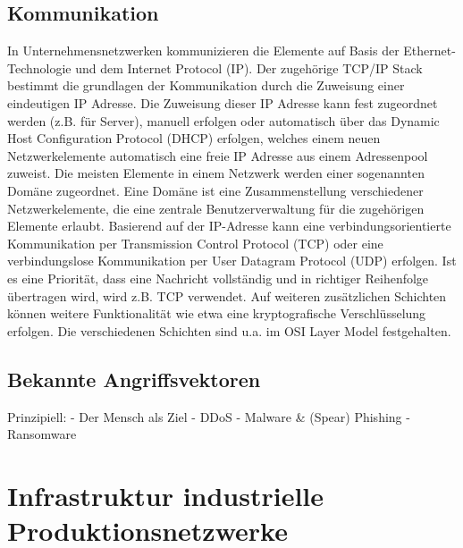 
\subsection{Kommunikation}
In Unternehmensnetzwerken kommunizieren die Elemente auf Basis der Ethernet-Technologie und dem Internet Protocol (IP). Der zugehörige TCP/IP Stack bestimmt die grundlagen der Kommunikation durch die Zuweisung einer eindeutigen IP Adresse. Die Zuweisung dieser IP Adresse kann fest zugeordnet werden (z.B. für Server), manuell erfolgen oder automatisch über das Dynamic Host Configuration Protocol (DHCP) erfolgen, welches einem neuen Netzwerkelemente automatisch eine freie IP Adresse aus einem Adressenpool zuweist. Die meisten Elemente in einem Netzwerk werden einer sogenannten Domäne zugeordnet. Eine Domäne ist eine Zusammenstellung verschiedener Netzwerkelemente, die eine zentrale Benutzerverwaltung für die zugehörigen Elemente erlaubt. 
Basierend auf der IP-Adresse kann eine verbindungsorientierte Kommunikation per Transmission Control Protocol (TCP) oder eine verbindungslose Kommunikation per User Datagram Protocol (UDP) erfolgen.  Ist es eine Priorität, dass eine Nachricht vollständig und in richtiger Reihenfolge übertragen wird, wird z.B. TCP verwendet. Auf weiteren zusätzlichen Schichten können weitere Funktionalität wie etwa eine kryptografische Verschlüsselung erfolgen. Die verschiedenen Schichten sind u.a. im OSI Layer Model festgehalten.

\subsection{Bekannte Angriffsvektoren}
Prinzipiell:
- Der Mensch als Ziel
- DDoS
- Malware \& (Spear) Phishing
- Ransomware

\section{Infrastruktur industrielle Produktionsnetzwerke}
